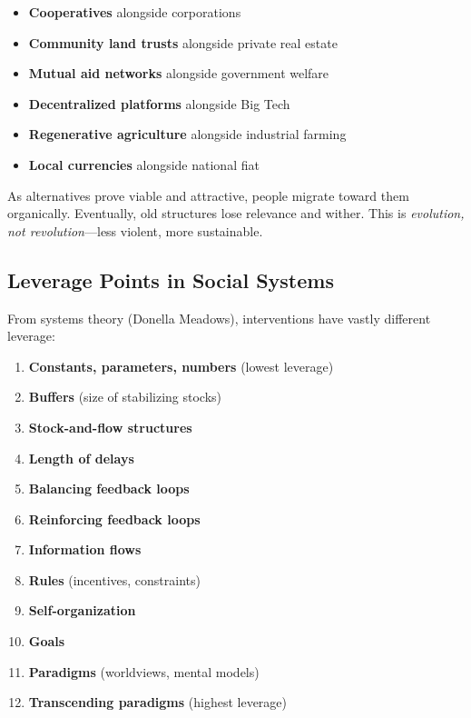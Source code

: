 \documentclass[11pt,a4paper]{article}
\theoremstyle{definition}
\theoremstyle{remark}
\begin{document}
\begin{itemize}[leftmargin=1.5em]
    \item \textbf{Cooperatives} alongside corporations
    \item \textbf{Community land trusts} alongside private real estate
    \item \textbf{Mutual aid networks} alongside government welfare
    \item \textbf{Decentralized platforms} alongside Big Tech
    \item \textbf{Regenerative agriculture} alongside industrial farming
    \item \textbf{Local currencies} alongside national fiat
\end{itemize}

As alternatives prove viable and attractive, people migrate toward them organically. Eventually, old structures lose relevance and wither. This is \textit{evolution, not revolution}---less violent, more sustainable.

\subsection{Leverage Points in Social Systems}

From systems theory (Donella Meadows), interventions have vastly different leverage:

\begin{enumerate}[leftmargin=1.5em]
    \item[12.] \textbf{Constants, parameters, numbers} (lowest leverage)
    \item[11.] \textbf{Buffers} (size of stabilizing stocks)
    \item[10.] \textbf{Stock-and-flow structures}
    \item[9.] \textbf{Length of delays}
    \item[8.] \textbf{Balancing feedback loops}
    \item[7.] \textbf{Reinforcing feedback loops}
    \item[6.] \textbf{Information flows}
    \item[5.] \textbf{Rules} (incentives, constraints)
    \item[4.] \textbf{Self-organization}
    \item[3.] \textbf{Goals}
    \item[2.] \textbf{Paradigms} (worldviews, mental models)
    \item[1.] \textbf{Transcending paradigms} (highest leverage)
\end{enumerate}
\end{document}
